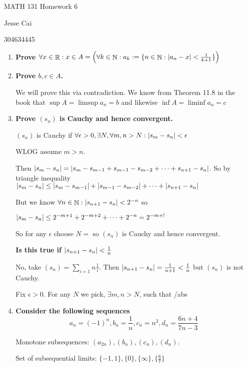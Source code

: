 \documentclass[10pt,a4paper]{article}
\DeclareMathOperator*{\R}{\mathbb{R}}
\DeclareMathOperator*{\N}{\mathbb{N}}
\DeclarePairedDelimiter{\abs}{\lvert}{\rvert}
\begin{document}
MATH 131 Homework 6

Jesse Cai

304634445

\begin{enumerate}
    \item \textbf{Prove $\forall x \in \R: x \in A  = \left(\forall k \in \N: a_k := \{n \in \N  : \abs{a_n - x} < \frac{1}{k+1}\} \right)$}

    \item \textbf{Prove $b, c \in A$.}

        We will prove this via contradiction. We know from Theorem 11.8 in the book that $\sup A = \limsup a_n = b $ and likewise $\inf A = \liminf a_n = c $

    \item \textbf{Prove $( s_n )$ is Cauchy and hence convergent.}

        $ (s_n)$ is Cauchy if $\forall \epsilon > 0, \exists N, \forall m, n > N: \abs{s_m - s_n} < \epsilon$

        WLOG assume $m>n$.

        Then $\abs{s_m - s_n } = \abs{s_m - s_{m-1} + s_{m-1} - s_{m-2} + \cdots + s_{n+1} - s_n}$. So by triangle inequality 
        $\abs{s_m - s_n } \leq \abs{s_m - s_{m-1}} +\abs{s_{m-1} - s_{m-2}} + \cdots + \abs{s_{n+1} - s_n}$

        But we know $\forall n \in \N: \abs{s_{n+1} - s_n} < 2^{-n}$ so 

        $\abs{s_m - s_n } \leq 2^{-m+1} + 2^{-m+2} + \cdots + 2^{-n} = 2^{-m+!}$

        So for any $\epsilon$ choose $N = $ so $(s_n)$ is Cauchy and hence convergent.

        \textbf{Is this true if $\abs{s_{n+1} - s_n} < \frac{1}{n}$ }

        No, take $(s_n) = \sum_{i=1}{n} \frac{1}{i}$. Then $\abs{s_{n+1} - s_n} = \frac{1}{n+1} < \frac{1}{n}$ but $(s_n)$ is not Cauchy.

        Fix $\epsilon > 0 $. For any $N$ we pick, $\exists m,n > N$,  such that /abs
    
    \item \textbf{Consider the following sequences $$a_n = (-1)^n, b_n = \frac{1}{n}, c_n = n^2, d_n = \frac{6n+4}{7n-3}$$}

        Monotone subsequences: $(a_{2n}), (b_n), (c_n ), (d_n)$.

        Set of subsequential limits: $\{-1, 1\}, \{0\}, \{\infty \}, \{\frac{6}{7}\}$


\end{enumerate}
\end{document}
